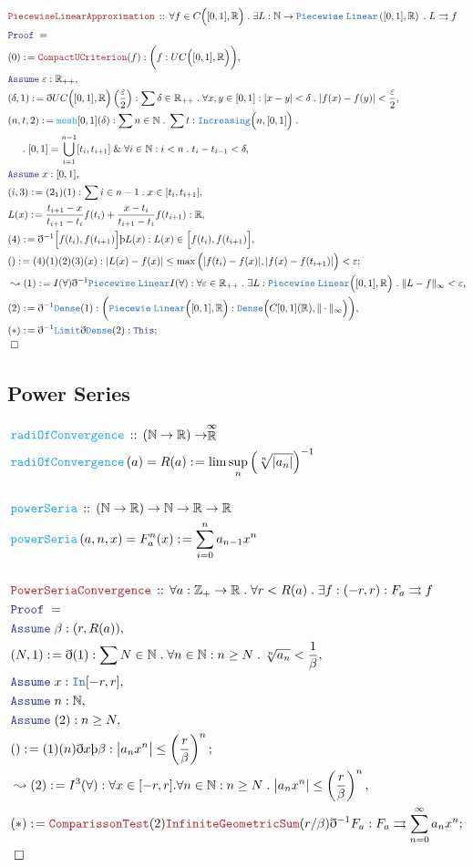 \documentclass[12pt]{scrartcl}
\newcommand{\TYPE}[1]{\textcolor{NavyBlue}{\mathtt{#1}}}
\newcommand{\FUNC}[1]{\textcolor{Cerulean}{\mathtt{#1}}}
\newcommand{\LOGIC}[1]{\textcolor{Blue}{\mathtt{#1}}}
\newcommand{\THM}[1]{\textcolor{Maroon}{\mathtt{#1}}}
\renewcommand{\.}{\; . \;}
\newcommand{\de}{: \kern 0.1pc =}
\newcommand{\Act}[1]{\left( #1 \right)}
\newcommand{\Theorem}[2]{& \THM{#1} \, :: \, #2 \\ & \Proof = \\ }
\newcommand{\DeclareFunc}[2]{& \FUNC{#1} \, :: \, #2 \\}
\newcommand{\DefineNamedFunc}[4]{&  \FUNC{#1}\Act{#2} = #3 \de #4 \\}
\newcommand{\NewLine}{\\ & \kern 1pc}
\newcommand{\Page}[1]{ \begin{align*} #1 \end{align*}   }
\newcommand{ \bd }{ \ByDef }
\renewcommand{\And}{\; \& \;}
\newcommand{\Int}{\mathbb{Z} }
\newcommand{\Reals}{\mathbb{R} }
\newcommand{\Nat}{\mathbb{N} }
\newcommand{\EReals}{\stackrel{\mathclap{\infty}}{\mathbb{R}}}
\newcommand{\Say}[3]{& #1 \de #2 : #3, \\}
\newcommand{\Conclude}[3]{& #1 \de #2 : #3; \\}
\newcommand{\Derive}[3]{& \leadsto #1 \de #2 : #3, \\}
\newcommand{\Assume}[2]{& \LOGIC{Assume} \;#1 : #2, \\}
\newcommand{\QED}{\; \square}
\newcommand{\EndProof}{& \QED \\}
\newcommand{\ByDef}{\eth}
\newcommand{\ByConstr}{\text{\thorn}}
\newcommand{\Proof}{\LOGIC{Proof} \; }
\newcommand{\ToU}{\rightrightarrows}
\begin{document}
\newpage
\Page{
	\Theorem{PiecewiseLinearApproximation}
	{ 
		\forall f \in  C\Big([0,1], \Reals\Big) \. \exists L : \Nat \to \TYPE{Piecewise} \; \TYPE{Linear} 
		\left([0,1], \Reals \right) \. L \ToU f 
	}
	\Say{(0)}{\THM{CompactUCriterion}(f)}{ \bigg( f : UC\Big( [0,1], \Reals \Big) \bigg)}
	\Assume{\varepsilon}{\Reals_{++}}
	\Say{(\delta,1)}{\bd UC\Big( [0,1], \Reals  \Big)\left( \frac{\varepsilon}{2} \right)}{  
		\sum \delta \in \Reals_{++} \.  \forall x,y \in [0,1] :  |x - y| < \delta \.    
		| f(x) - f(y) | < \frac{\varepsilon}{2}
		}
	\Say{(n,t,2)}{ \FUNC{mesh}[0,1](\delta)}{ \sum n \in \Nat \. \sum t : \TYPE{Increasing}\Big(n,[0,1] \Big) \.  
	  \NewLine \. 
	  [0,1] = \bigcup^{n-1}_{i=1} [t_i,t_{i+1}] \And \forall i \in \Nat : i < n \. t_i - t_{i-1} < \delta 
	}
	\Assume{x}{[0,1]}
	\Say{(i,3)}{(2_1)(1)}{ \sum i \in n - 1 \.   x \in [t_i,t_{i + 1}] }
	\Say{  L(x)}{  \frac{t_{i + 1} - x}{ t_{i + 1}  - t_i}f(t_i)  + 
		\frac{ x - t_{i}}{t_{i + 1} - t_i }    f(t_{i + 1})   }{\Reals}
	\Say{(4)}{\bd^{-1} \Big[f(t_{i}),f(t_{i+1})\Big] \ByConstr L(x)}{L(x) \in \Big[ f(t_{i}), f(t_{i+1}) \Big]}
	\Conclude{()}{(4)(1)(2)(3)(x) }{ | L(x) - f(x) | \le \max\Big( |f(t_i) - f(x)|,|f(x) - f(t_{i+1})|  \Big) 
	 < \varepsilon
	}
	\Derive{(1)}{I(\forall)\bd^{-1} \TYPE{Piecewise} \; \TYPE{Linear} I(\forall)}
	{\forall \varepsilon \in \Reals_{++} \. \exists L : \TYPE{Piecewise} \; \TYPE{Linear} \Big( [0,1],\Reals \Big) 
		\.   \|  L   -  f\|_{\infty} < \varepsilon
	}
	\Say{(2)}{\bd^{-1} \TYPE{Dense}(1)}{\bigg( \TYPE{Piecewie} \; \TYPE{Linear}\Big([0,1],\Reals\Big) : 
		\TYPE{Dense}\Big( C[0,1](\Reals), \| \cdot \|_\infty \Big) \bigg)}
	\Conclude{(*)}{\bd^{-1} \TYPE{Limit} \bd \TYPE{Dense}(2)  }{
			\LOGIC{This}
		}
	\EndProof
}
\newpage
\subsection{Power Series }
\Page{
	\DeclareFunc{radiOfConvergence}{ (\Nat \to \Reals) \to \EReals}
	\DefineNamedFunc{radiOfConvergence}
	{a}{R(a)}{\lim \sup_{n} \Big( \sqrt[n]{|a_n|}  \Big)^{-1} }
	\\
	\DeclareFunc{ powerSeria  }{  (\Nat \to \Reals ) \to \Nat \to \Reals \to \Reals    }
	\DefineNamedFunc{powerSeria}{a,n,x}{F^n_a(x)}{ \sum^n_{i = 0} a_{n-1} x^n}
	\\
	\Theorem{PowerSeriaConvergence}{
		\forall a : \Int_+ \to \Reals \. \forall r < R(a) \. \exists f  : (-r,r) : F_a \ToU f   }
	\Assume{\beta}{ (r,R(a)) }
	\Say{(N,1)}{\bd (1)}{  \sum N \in \Nat \. \forall n \in \Nat : n \ge N \. \sqrt[n]{a_n} < \frac{1}{\beta} }
	\Assume{x}{\TYPE{In}[-r,r]}
	\Assume{n}{\Nat}
	\Assume{(2)}{ n \ge N  }
	\Conclude{()}{(1)(n)\bd x \ByConstr \beta}{ \big|a_n x^n \big| \le \left( \frac{r}{\beta}  \right)^n  }
	\Derive{(2)}{I^3(\forall)}{ \forall x \in [-r,r] . \forall n \in \Nat : n \ge N \. \big| a_n x^n| \le 
		\left( \frac{r}{\beta} \right)^n}
	\Conclude{(*)}{\THM{ComparissonTest}(2)\THM{InfiniteGeometricSum}(r/\beta)\bd^{-1} F_a}
	{  F_a \ToU \sum^\infty_{n=0} a_nx^n  }
	\EndProof
}
\newpage
\end{document}
